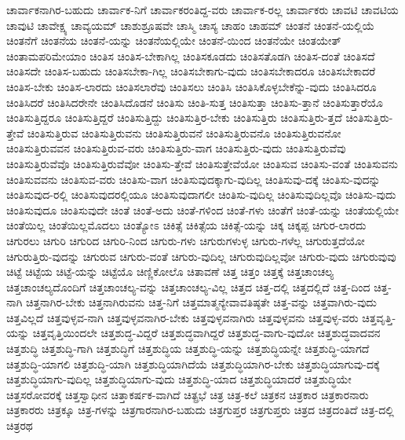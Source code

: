 {ಚಾರ್ವಾಕನಾಗಿರ-ಬಹುದು
ಚಾರ್ವಾಕ-ನಿಗೆ
ಚಾರ್ವಾಕರಂತಿದ್ದ-ವರು
ಚಾರ್ವಾಕ-ರಲ್ಲ
ಚಾರ್ವಾಕರು
ಚಾವಟಿ
ಚಾವಟಿಯ
ಚಾವುಟಿ
ಚಾವೇಕ್ಷ್ಯ
ಚಾವ್ಯಯಮ್
ಚಾಶುಶ್ರೂಷವೇ
ಚಾಸ್ಮಿ
ಚಾಸ್ಯ
ಚಾಹಂ
ಚಾಹಮ್
ಚಿಂತನೆ
ಚಿಂತನೆ-ಯಲ್ಲಿಯೆ
ಚಿಂತನೆಗೆ
ಚಿಂತನೆಯ
ಚಿಂತನೆ-ಯನ್ನು
ಚಿಂತನೆಯಲ್ಲಿಯೇ
ಚಿಂತನೆ-ಯಿಂದ
ಚಿಂತನೆಯೇ
ಚಿಂತಯೇತ್
ಚಿಂತಾಮಪರಿಮೇಯಾಂ
ಚಿಂತಿಸ
ಚಿಂತಿಸ-ಬೇಕಾಗಿಲ್ಲ
ಚಿಂತಿಸಕೂಡದು
ಚಿಂತಿಸತೊಡಗಿ
ಚಿಂತಿಸ-ದಂತೆ
ಚಿಂತಿಸದೆ
ಚಿಂತಿಸದೇ
ಚಿಂತಿಸ-ಬಹುದು
ಚಿಂತಿಸಬೇಕಾ-ಗಿಲ್ಲ
ಚಿಂತಿಸಬೇಕಾಗು-ವುದು
ಚಿಂತಿಸಬೇಕಾದರೂ
ಚಿಂತಿಸಬೇಕಾದರೆ
ಚಿಂತಿಸ-ಬೇಕು
ಚಿಂತಿಸ-ಲಾರದು
ಚಿಂತಿಸಲಾರೆವು
ಚಿಂತಿಸಲು
ಚಿಂತಿಸಿ
ಚಿಂತಿಸಿಕೊಳ್ಳಬೇಕೆನ್ನು-ವುದು
ಚಿಂತಿಸಿದರೂ
ಚಿಂತಿಸಿದರೆ
ಚಿಂತಿಸಿದರೇನೇ
ಚಿಂತಿಸಿದೊಡನೆ
ಚಿಂತಿಸು
ಚಿಂತಿ-ಸುತ್ತ
ಚಿಂತಿಸುತ್ತಾ
ಚಿಂತಿಸು-ತ್ತಾನೆ
ಚಿಂತಿಸುತ್ತಾರೆಯೊ
ಚಿಂತಿಸುತ್ತಿದ್ದರೂ
ಚಿಂತಿಸುತ್ತಿದ್ದರೆ
ಚಿಂತಿಸುತ್ತಿದ್ದು
ಚಿಂತಿಸುತ್ತಿರ-ಬೇಕು
ಚಿಂತಿಸುತ್ತಿರು
ಚಿಂತಿಸುತ್ತಿರು-ತ್ತದೆ
ಚಿಂತಿಸುತ್ತಿರು-ತ್ತೇವೆ
ಚಿಂತಿಸುತ್ತಿರುವ
ಚಿಂತಿಸುತ್ತಿರುವನು
ಚಿಂತಿಸುತ್ತಿರುವನೆ
ಚಿಂತಿಸುತ್ತಿರುವನೊ
ಚಿಂತಿಸುತ್ತಿರುವನೋ
ಚಿಂತಿಸುತ್ತಿರುವವನ
ಚಿಂತಿಸುತ್ತಿರುವ-ವರು
ಚಿಂತಿಸುತ್ತಿರು-ವಾಗ
ಚಿಂತಿಸುತ್ತಿರು-ವುದು
ಚಿಂತಿಸುತ್ತಿರುವೆವು
ಚಿಂತಿಸುತ್ತಿರುವೆವೊ
ಚಿಂತಿಸುತ್ತಿರುವೆವೋ
ಚಿಂತಿಸು-ತ್ತೇವೆ
ಚಿಂತಿಸುತ್ತೇವೆಯೋ
ಚಿಂತಿಸುವ
ಚಿಂತಿಸು-ವಂತೆ
ಚಿಂತಿಸುವನು
ಚಿಂತಿಸುವವನು
ಚಿಂತಿಸುವ-ವರು
ಚಿಂತಿಸು-ವಾಗ
ಚಿಂತಿಸುವುದಕ್ಕಾಗು-ವುದಿಲ್ಲ
ಚಿಂತಿಸುವು-ದಕ್ಕೆ
ಚಿಂತಿಸು-ವುದನ್ನು
ಚಿಂತಿಸುವುದ-ರಲ್ಲಿ
ಚಿಂತಿಸುವುದರಲ್ಲಿಯೂ
ಚಿಂತಿಸುವುದಾಗಲೀ
ಚಿಂತಿಸು-ವುದಿಲ್ಲ
ಚಿಂತಿಸುವುದಿಲ್ಲವೊ
ಚಿಂತಿಸು-ವುದು
ಚಿಂತಿಸುವುದೂ
ಚಿಂತಿಸುವುದೇ
ಚಿಂತೆ
ಚಿಂತೆ-ಅದು
ಚಿಂತೆ-ಗಳಿಂದ
ಚಿಂತೆ-ಗಳು
ಚಿಂತೆಗೆ
ಚಿಂತೆ-ಯನ್ನು
ಚಿಂತೆಯಲ್ಲಿಯೇ
ಚಿಂತೆಯಿಲ್ಲ
ಚಿಂತೆಯಿಲ್ಲಮೊದಲು
ಚಿಂತ್ಯೋಽ
ಚಿಕಿತ್ಸೆ
ಚಿಕಿತ್ಸೆಯ
ಚಿಕಿತ್ಸೆ-ಯನ್ನು
ಚಿಕ್ಕ
ಚಿಕ್ಕಪ್ಪ
ಚಿಗುರ-ಲಾರದು
ಚಿಗುರಲು
ಚಿಗುರಿ
ಚಿಗುರಿದ
ಚಿಗುರಿ-ನಿಂದ
ಚಿಗುರು-ಗಳು
ಚಿಗುರುಗಳುಳ್ಳ
ಚಿಗುರು-ಗಳೆಲ್ಲ
ಚಿಗುರುತ್ತದೆಯೋ
ಚಿಗುರುತ್ತಿರು-ವುದನ್ನು
ಚಿಗುರುವ
ಚಿಗುರು-ವಂತೆ
ಚಿಗುರು-ವುದಿಲ್ಲ
ಚಿಗುರುವುದಿಲ್ಲವೋ
ಚಿಗುರು-ವುದು
ಚಿಗುರುವುವು
ಚಿಟ್ಟೆ
ಚಿಟ್ಟೆಯ
ಚಿಟ್ಟೆ-ಯನ್ನು
ಚಿಟ್ಟೆಯೊ
ಚಿಣ್ಣಿಕೋಲೊ
ಚಿತಾವಣೆ
ಚಿತ್ತ
ಚಿತ್ತಂ
ಚಿತ್ತಕ್ಕೆ
ಚಿತ್ತಚಾಂಚಲ್ಯ
ಚಿತ್ತಚಾಂಚಲ್ಯದೊಂದಿಗೆ
ಚಿತ್ತಚಾಂಚಲ್ಯ-ವನ್ನು
ಚಿತ್ತಚಾಂಚಲ್ಯ-ವಿಲ್ಲ
ಚಿತ್ತದ
ಚಿತ್ತ-ದಲ್ಲಿ
ಚಿತ್ತದಲ್ಲಿದೆ
ಚಿತ್ತ-ದಿಂದ
ಚಿತ್ತ-ನಾಗಿ
ಚಿತ್ತನಾಗಿರ-ಬೇಕು
ಚಿತ್ತನಾಗಿರುವನು
ಚಿತ್ತ-ನಿಗೆ
ಚಿತ್ತಮಾತ್ಮನ್ಯೇವಾವತಿಷ್ಠತೇ
ಚಿತ್ತ-ವನ್ನು
ಚಿತ್ತವಾಗಿರು-ವುದು
ಚಿತ್ತವಿಲ್ಲದೆ
ಚಿತ್ತವುಳ್ಳವ-ನಾಗಿ
ಚಿತ್ತವುಳ್ಳವನಾಗಿರ-ಬೇಕು
ಚಿತ್ತವುಳ್ಳವನಾಗಿರು
ಚಿತ್ತವುಳ್ಳವನು
ಚಿತ್ತವುಳ್ಳ-ವರು
ಚಿತ್ತವೃತ್ತಿ-ಯನ್ನು
ಚಿತ್ತವೃತ್ತಿಯಿಂದಲೇ
ಚಿತ್ತಶುದ್ಧ-ವಿದ್ದರೆ
ಚಿತ್ತಶುದ್ಧವಾಗಿದ್ದರೆ
ಚಿತ್ತಶುದ್ಧ-ವಾಗು-ವುದೋ
ಚಿತ್ತಶುದ್ಧವಾದವನ
ಚಿತ್ತಶುದ್ಧಿ
ಚಿತ್ತಶುದ್ಧಿ-ಗಾಗಿ
ಚಿತ್ತಶುದ್ಧಿಗೆ
ಚಿತ್ತಶುದ್ಧಿಯ
ಚಿತ್ತಶುದ್ಧಿ-ಯನ್ನು
ಚಿತ್ತಶುದ್ಧಿಯನ್ನೇ
ಚಿತ್ತಶುದ್ಧಿ-ಯಾಗದೆ
ಚಿತ್ತಶುದ್ಧಿ-ಯಾಗಲಿ
ಚಿತ್ತಶುದ್ಧಿ-ಯಾಗಿ
ಚಿತ್ತಶುದ್ಧಿಯಾಗಿದೆಯೆ
ಚಿತ್ತಶುದ್ಧಿಯಾಗಿರ-ಬೇಕು
ಚಿತ್ತಶುದ್ಧಿಯಾಗುವು-ದಕ್ಕೆ
ಚಿತ್ತಶುದ್ಧಿಯಾಗು-ವುದಿಲ್ಲ
ಚಿತ್ತಶುದ್ಧಿಯಾಗು-ವುದು
ಚಿತ್ತಶುದ್ಧಿ-ಯಾದ
ಚಿತ್ತಶುದ್ಧಿಯಾದರೆ
ಚಿತ್ತಶುದ್ಧಿಯೇ
ಚಿತ್ತಸರೋವರಕ್ಕೆ
ಚಿತ್ತಸ್ವಾಧೀನ
ಚಿತ್ತಾಕರ್ಷಕ-ವಾಗಿದೆ
ಚಿತ್ಪ್ರಭೆ
ಚಿತ್ರ
ಚಿತ್ರ-ಕಲೆ
ಚಿತ್ರಕನ
ಚಿತ್ರಕಾರ
ಚಿತ್ರಕಾರನಾರು
ಚಿತ್ರಕಾರರು
ಚಿತ್ರಕ್ಕೂ
ಚಿತ್ರ-ಗಳನ್ನು
ಚಿತ್ರಗಾರನಾಗಿರ-ಬಹುದು
ಚಿತ್ರಗುಪ್ತರ
ಚಿತ್ರಗುಪ್ತರು
ಚಿತ್ರದ
ಚಿತ್ರದಂತಿದೆ
ಚಿತ್ರ-ದಲ್ಲಿ
ಚಿತ್ರರಥ
}
